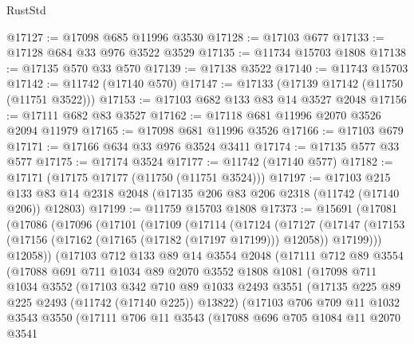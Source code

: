 \begin{lexlean}{RustStd}
\begin{coremodule}
@17127 := @17098 @685 @11996 @3530
@17128 := @17103 @677
@17133 := @17128 @684 @33 @976 @3522 @3529
@17135 := @11734 @15703 @1808
@17138 := @17135 @570 @33 @570
@17139 := @17138 @3522
@17140 := @11743 @15703
@17142 := @11742 (@17140 @570)
@17147 := @17133 (@17139 @17142 (@11750 (@11751 @3522)))
@17153 := @17103 @682 @133 @83 @14 @3527 @2048
@17156 := @17111 @682 @83 @3527
@17162 := @17118 @681 @11996 @2070 @3526 @2094 @11979
@17165 := @17098 @681 @11996 @3526
@17166 := @17103 @679
@17171 := @17166 @634 @33 @976 @3524 @3411
@17174 := @17135 @577 @33 @577
@17175 := @17174 @3524
@17177 := @11742 (@17140 @577)
@17182 := @17171 (@17175 @17177 (@11750 (@11751 @3524)))
@17197 := @17103
    @215
    @133
    @83
    @14
    @2318
    @2048
    (@17135 @206 @83 @206 @2318 (@11742 (@17140 @206)) @12803)
@17199 := @11759 @15703 @1808
@17373 := @15691
    (@17081
      (@17086
        (@17096
          (@17101
            (@17109
              (@17114
                (@17124
                  (@17127
                    (@17147
                      (@17153 (@17156 (@17162 (@17165 (@17182 (@17197 @17199))) @12058)) @17199)))
                  @12058))
              (@17103
                @712
                @133
                @89
                @14
                @3554
                @2048
                (@17111
                  @712
                  @89
                  @3554
                  (@17088
                    @691
                    @711
                    @1034
                    @89
                    @2070
                    @3552
                    @1808
                    @1081
                    (@17098
                      @711
                      @1034
                      @3552
                      (@17103
                        @342
                        @710
                        @89
                        @1033
                        @2493
                        @3551
                        (@17135 @225 @89 @225 @2493 (@11742 (@17140 @225)) @13822)
                        (@17103
                          @706
                          @709
                          @11
                          @1032
                          @3543
                          @3550
                          (@17111
                            @706
                            @11
                            @3543
                            (@17088
                              @696
                              @705
                              @1084
                              @11
                              @2070
                              @3541

\end{coremodule}
\end{lexlean}
